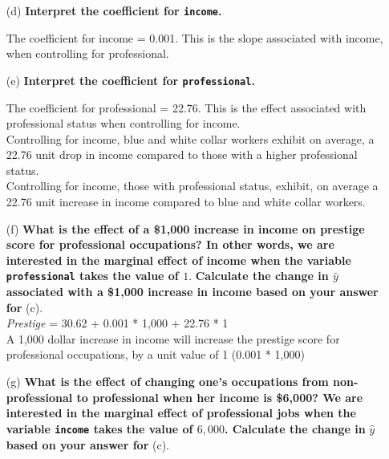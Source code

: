 \documentclass[12pt,letterpaper]{article}
\begin{document}
\begin{enumerate}
	\item [(d)]
\textbf{	Interpret the coefficient for \texttt{income}. \\}
	
	The coefficient for income = 0.001. This is the slope associated with income, when controlling for professional.\\
	
		
	\item [(e)]
\textbf{	Interpret the coefficient for \texttt{professional}. \\}
	
	The coefficient for professional = 22.76. This is the effect associated with professional status when controlling for income.\\
	
	Controlling for income, blue and white collar workers exhibit on average, a 22.76 unit drop in income compared to those with a higher professional status.\\

	Controlling for income, those with professional status, exhibit, on average a 22.76 unit increase in income compared to blue and white collar workers.\\
	
	
	\item [(f)]
\textbf{	What is the effect of a \$1,000 increase in income on prestige score for professional occupations? In other words, we are interested in the marginal effect of income when the variable \texttt{professional} takes the value of $1$}.\textbf{ Calculate the change in $\hat{y}$ associated with a \$1,000 increase in income based on your answer for} (c). \\
	
	\textit{Prestige} = 30.62 + 0.001 * 1,000 + 22.76 * 1 \\
	
	A 1,000 dollar increase in income will increase the prestige score for professional occupations, by a unit value of 1 (0.001 * 1,000)
	
 	
	\vspace{10cm}
	
	
	\item [(g)]
\textbf{	What is the effect of changing one's occupations from non-professional to professional when her income is \$6,000? We are interested in the marginal effect of professional jobs when the variable \texttt{income} takes the value of $6,000$. Calculate the change in} $\hat{y}$ \textbf{based on your answer for }(c).\\
	

\end{enumerate}
\end{document}
